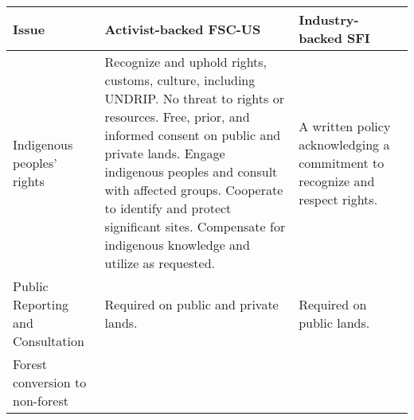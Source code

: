 \begin{table}
\caption{Qualitative Levels of Performance Required for Certification}
\label{issues}
\footnotesize

\begin{longtable}[]{@{}lll@{}}
\toprule
\begin{minipage}[b]{0.20\columnwidth}\raggedright\strut
Issue\strut
\end{minipage} & \begin{minipage}[b]{0.36\columnwidth}\raggedright\strut
Activist-backed FSC-US\strut
\end{minipage} & \begin{minipage}[b]{0.36\columnwidth}\raggedright\strut
Industry-backed SFI\strut
\end{minipage}\tabularnewline
\midrule
\endhead
\begin{minipage}[t]{0.20\columnwidth}\raggedright\strut
Indigenous peoples' rights\strut
\end{minipage} & \begin{minipage}[t]{0.36\columnwidth}\raggedright\strut
Recognize and uphold rights, customs, culture, including UNDRIP. No
threat to rights or resources. Free, prior, and informed consent on
public and private lands. Engage indigenous peoples and consult with
affected groups. Cooperate to identify and protect significant sites.
Compensate for indigenous knowledge and utilize as requested.\strut
\end{minipage} & \begin{minipage}[t]{0.36\columnwidth}\raggedright\strut
A written policy acknowledging a commitment to recognize and respect
rights.\strut
\end{minipage}\tabularnewline
\begin{minipage}[t]{0.20\columnwidth}\raggedright\strut
Public Reporting and Consultation\strut
\end{minipage} & \begin{minipage}[t]{0.36\columnwidth}\raggedright\strut
Required on public and private lands.\strut
\end{minipage} & \begin{minipage}[t]{0.36\columnwidth}\raggedright\strut
Required on public lands.\strut
\end{minipage}\tabularnewline
\begin{minipage}[t]{0.20\columnwidth}\raggedright\strut
Forest conversion to non-forest\strut
\end{minipage} & \begin{minipage}[t]{0.36\columnwidth}\raggedright\strut

\end{minipage}
\end{longtable}
\end{table}

